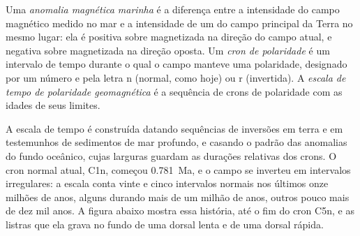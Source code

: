 \begin{definition}\label{def:b1:plate-kinematics:magnetic-anomaly}
Uma \emph{anomalia magnética marinha} é a
diferença entre a intensidade do campo magnético medido no mar e a
intensidade de um  do campo principal da Terra no mesmo lugar: ela
é positiva sobre  magnetizada na direção do campo atual, e
negativa sobre  magnetizada na direção oposta. Um \emph{cron de
polaridade} é um intervalo de tempo durante o qual o campo manteve
uma polaridade, designado por um número e pela letra n (normal, como hoje) ou r
(invertida). A \emph{escala de tempo de polaridade geomagnética}
é a sequência de crons de polaridade com as idades de seus
limites.
\end{definition}

A escala de tempo é construída datando sequências de inversões em terra e em testemunhos de sedimentos de mar profundo, e
casando o padrão das anomalias do fundo oceânico, cujas
larguras guardam as durações relativas dos crons. O cron normal atual, C1n, começou
\qty{0.781}{Ma}, e o campo se inverteu em intervalos irregulares: a
escala conta vinte e cinco intervalos normais nos últimos onze milhões de anos,
alguns durando mais de um milhão de anos, outros pouco mais de dez
mil anos. A
figura abaixo mostra essa história, até o fim do cron C5n, e as listras
que ela grava no fundo de uma dorsal lenta e de uma dorsal rápida.

